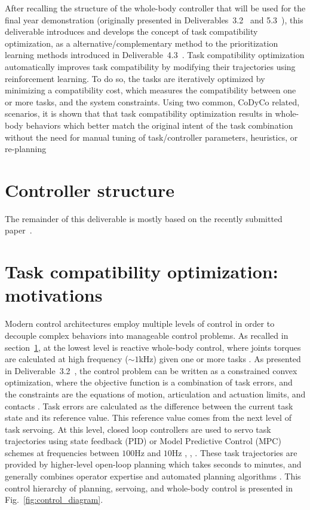 \documentclass[12pt,a4paper,twoside]{article}
\begin{document}
After recalling the structure of the whole-body controller that will be used for the final year demonstration (originally presented in Deliverables~3.2~\cite{deliverable32} and 5.3~\cite{deliverable53}), this deliverable introduces and develops the concept of task compatibility optimization, as a alternative/complementary method to the prioritization learning methods introduced in Deliverable~4.3~\cite{deliverable43}. Task compatibility optimization automatically improves task compatibility by modifying their trajectories using reinforcement learning. To do so, the tasks are iteratively optimized by minimizing a compatibility cost, which measures the compatibility between one or more tasks, and the system constraints. Using two common, CoDyCo related, scenarios, it is shown that that task compatibility optimization results in whole-body behaviors which better match the original intent of the task combination without the need for manual tuning of task/controller parameters, heuristics, or re-planning

\section{Controller structure}
\label{sec:controller}


The remainder of this deliverable is mostly based on the recently submitted paper~\underline{\bf \cite{lober2017RAL-IROS}}.


\section{Task compatibility optimization: motivations}
\label{sec:introduction}


Modern control architectures employ multiple levels of control in order to decouple complex behaviors into manageable control problems. As recalled in section~\ref{sec:controller}, at the lowest level is reactive whole-body control, where joints torques are calculated at high frequency ($\sim1$kHz) given one or more tasks \cite{Khatib2004}. As presented in Deliverable~3.2~\cite{deliverable32}, the control problem can be written as a constrained convex optimization, where the objective function is a combination of task errors, and the constraints are the equations of motion, articulation and actuation limits, and contacts \cite{Salini2011, Saab2013, Bouyarmane2011}. Task errors are calculated as the difference between the current task state and its reference value. This reference value comes from the next level of task servoing. At this level, closed loop controllers are used to servo task trajectories using state feedback (PID) or Model Predictive Control (MPC) schemes at frequencies between $100$Hz and $10$Hz \underline{\bf \cite{Ibanez2014}}, \cite{Koenemann2015}, \underline{\bf \cite{Perrin2015}}. These task trajectories are provided by higher-level open-loop planning which takes seconds to minutes, and generally combines operator expertise and automated planning algorithms \cite{Bouyarmane2012, Pham2014}. This control hierarchy of planning, servoing, and whole-body control is presented in Fig.~\ref{fig:control_diagram}.\\
\end{document}
